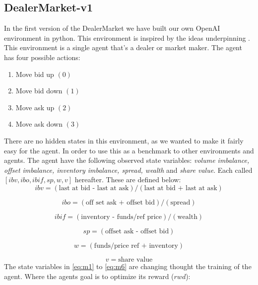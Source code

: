 \documentclass{kththesis}
\theoremstyle{definition}
\begin{document}
\subsection{DealerMarket-v1}
In the first version of the DealerMarket we have built our own OpenAI environment in python. This environment is inspired by the ideas underpinning \textcite{ho1981optimal}. This environment is a single agent that's a dealer or market maker. The agent has four possible actions:
\begin{enumerate}
    \item Move bid up $(0)$
    \item Move bid down $(1)$
    \item Move ask up $(2)$
    \item Move ask down $(3)$
\end{enumerate}
There are no hidden states in this environment, as we wanted to make it fairly easy for the agent. In order to use this as a benchmark to other environments and agents. The agent have the following observed state variables: \textit{volume imbalance, offset imbalance, inventory imbalance, spread, wealth} and \textit{share value}. Each called $[ibv, ibo, ibif,sp, w,v]$ hereafter. These are defined below:
\begin{equation}
\label{eq:m1}
    ibv = (\text{last at bid - last at ask})/(\text{last at bid + last at ask})
\end{equation}

\begin{equation}
\label{eq:m2}
    ibo = (\text{off set ask + offset bid})/(\text{spread})
\end{equation}

\begin{equation}
\label{eq:m3}
    ibif = (\text{inventory - funds/ref price})/(\text{wealth})
\end{equation}

\begin{equation}
\label{eq:m4}
    sp = (\text{offset ask - offset bid})
\end{equation}

\begin{equation}
\label{eq:m5}
    w = (\text{funds/price ref + inventory})
\end{equation}

\begin{equation}
\label{eq:m6}
    v = \text{share value}
\end{equation}
The state variables in \autoref{eq:m1} to \autoref{eq:m6} are changing thought the training of the agent. Where the agents goal is to optimize its reward ($rwd$):
\end{document}
